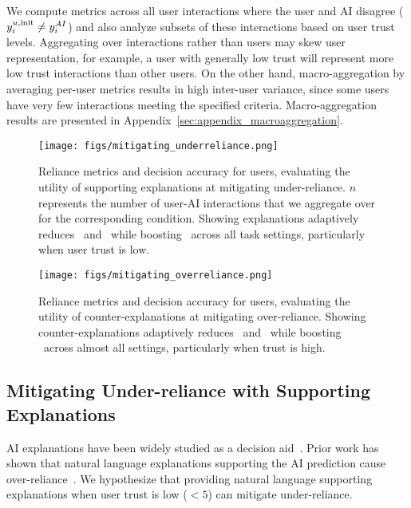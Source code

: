 We compute metrics across all user interactions where the user and AI disagree ($y^{u,\text{init}}_i \neq y^{AI}_i$) and also analyze subsets of these interactions based on user trust levels.
Aggregating over interactions rather than users may skew user representation, for example, a user with generally low trust will represent more low trust interactions than other users. 
On the other hand, macro-aggregation by averaging per-user metrics results in high inter-user variance, since some users have very few interactions meeting the specified criteria.
Macro-aggregation results are presented in Appendix~\ref{sec:appendix_macroaggregation}.

\begin{figure*}[t]
    \centering
    \texttt{[image: figs/mitigating\_underreliance.png]}
    \caption{Reliance metrics and decision accuracy for users, evaluating the utility of supporting explanations at mitigating under-reliance. $n$ represents the number of user-AI interactions that we aggregate over for the corresponding condition. Showing explanations adaptively reduces \underreliance\ and \totalinapprel\ while boosting \finalacc\ across all task settings, particularly when user trust is low.}
    \label{fig:mitigating_underreliance}
    \vspace{0.5em}
    \texttt{[image: figs/mitigating\_overreliance.png]}
    \caption{Reliance metrics and decision accuracy for users, evaluating the utility of counter-explanations at mitigating over-reliance. Showing counter-explanations adaptively reduces \overreliance\ and \totalinapprel\ while boosting \finalacc\ across almost all settings, particularly when trust is high.}
    \label{fig:mitigating_overreliance}
\end{figure*}


\subsection{Mitigating Under-reliance with Supporting Explanations}
\label{subsec:mitigate_underreliance}

AI explanations have been widely studied as a decision aid~\cite{bussone2015role,wang2021explanations,poursabzi2021manipulating}. 
Prior work has shown that natural language explanations supporting the AI prediction cause over-reliance~\cite{si2024large,sieker2024illusion,hashemi-chaleshtori-etal-2024-evaluating}. 
We hypothesize that providing natural language supporting explanations when user trust is low ($< 5$) can mitigate under-reliance. 

